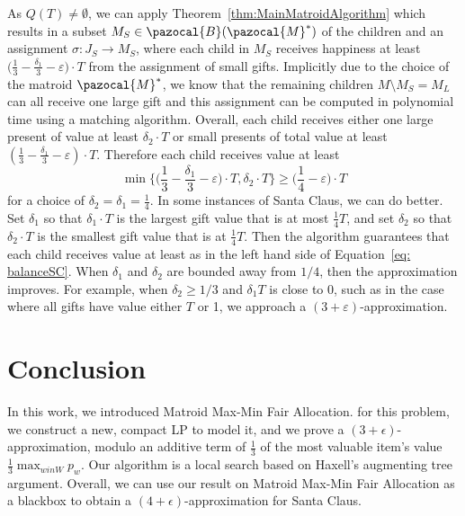  



As $Q(T) \neq \emptyset$, we can apply Theorem~\ref{thm:MainMatroidAlgorithm} 
which results in a subset $M_S \in \pazocal{B}(\pazocal{M}^*) $
 of the children and an assignment $\sigma : J_S \to M_S$, 
where each child in $M_S$ receives happiness at least 
$ \big(\frac13 - \frac{\delta_1}{3} - \varepsilon \big) \cdot T$ from the assignment of small gifts.
Implicitly due to the choice of the matroid $\pazocal{M}^*$, 
we know that the remaining children $M \setminus M_S = M_L$ can all receive one large gift
and this assignment can be computed in polynomial time using a matching algorithm. 
Overall, each child receives either one large present of value
at least $\delta_2 \cdot T$ or small presents of total value at least $(\frac{1}{3} - \frac{\delta_1}{3}-\varepsilon ) \cdot T$. 
Therefore each child receives value at least
\begin{equation}\label{eq: balanceSC}
  \min\Big\{ \Big(\frac{1}{3}-\frac{\delta_1}{3}-\varepsilon\Big) \cdot T, \delta_2 \cdot T \Big\} \geq \Big(\frac{1}{4}-\varepsilon\Big) \cdot T
\end{equation}
for a choice of $\delta_2 = \delta_1=\frac{1}{4}$. 
In some instances of Santa Claus, we can do better. 
Set $\delta_1$ so that $\delta_1 \cdot T$ is the largest gift value
that is at most $\frac14 T$, and set $\delta_2$ so that $\delta_2 \cdot T$ 
is the smallest gift value that is at $\frac14 T$.
Then the algorithm guarantees that each child receives value at least 
as in the left hand side of Equation~\ref{eq: balanceSC}. 
When $\delta_1$ and $\delta_2$ are bounded away from $1/4$,
then the approximation improves. 
For example, when $\delta_2 \geq 1/3$ and $\delta_1 T$ is close to 0,
such as in the case where all gifts have value either $T$ or 1,
we approach a $(3+\varepsilon)$-approximation.

\section{Conclusion}
In this work, we introduced Matroid Max-Min Fair Allocation. 
for this problem, we construct a new, compact LP to model it, 
and we prove a $(3+\epsilon)$-approximation, modulo an additive term of $\frac13$ of the most valuable item's value $\frac13 \max_{w in W} p_w$.
Our algorithm is a local search based on Haxell's augmenting tree argument.
Overall, we can use our result on Matroid Max-Min Fair Allocation as a blackbox to obtain a $(4+\epsilon)$-approximation for Santa Claus.


